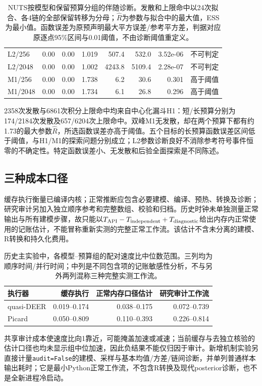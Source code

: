 \begin{table}[htbp]
\begin{tabular}{lrrrrrrl}
L2/256 & 0.00 & 0.00 & 1.019 & 507.4 & 532.0 & 3.52e-06 & 不可判定\\

L2/2048 & 0.00 & 0.00 & 1.002 & 4243.8 & 5109.4 & 2.28e-07 & 不可判定\\

M1/256 & 0.00 & 0.00 & 1.738 & 6.2 & 30.6 & 0.301 & 高于阈值\\

M1/2048 & 0.00 & 0.00 & 1.734 & 6.1 & 26.8 & 0.296 & 高于阈值\\

\bottomrule\end{tabular}
\caption{NUTS按模型和保留预算分组的伴随诊断。发散和上限命中以24次拟合、各4链的全部保留转移为分母；$\hat R$为参数与拟合中的最大值，ESS为最小值。函数误差为原预声明最大平方误差/参考平方差，判据对应原逐点95\%区间与0.01阈值，不由诊断阈值重定义。}
\end{table}
2358次发散与6861次积分上限命中均来自中心化漏斗H1：短/长预算分别为174/2184次发散及657/6204次上限命中。双峰M1无发散，却在两个预算下都有约1.73的最大参数$\hat R$，所选函数误差亦高于阈值。五个目标的长预算函数误差区间低于阈值，与H1/M1的探索问题分别成立；L2参数诊断良好不消除参考符号事件恒零的不确定性。特定函数误差小、无发散和后验全面探索是不同陈述。

\subsection{三种成本口径}
缓存执行衡量已编译内核；正常推断应包含必要建模、编译、预热、转换及诊断；研究审计另加入独立顺序参考和完整数组、校验和归档。历史时钟未单独测量正常输出与所有建模步骤，故只能以$T_{\rm API}-T_{\rm independent}+T_{\rm diagnostic}$给出内存内正常使用的记账估计，不能冒称重新实测的完整正常工作流。该估计不含未分离的建模、R转换和持久化费用。

\begin{table}[htbp]\centering\small\setlength{\tabcolsep}{4pt}
\begin{tabular}{lrrr}\toprule
执行器 & 缓存执行 & 正常内存口径估计 & 研究审计工作流\\\midrule

quasi-DEER & 0.019--0.174 & 0.038--0.175 & 0.072--0.739\\

Picard & 0.050--0.809 & 0.110--0.393 & 0.226--0.814\\

\bottomrule\end{tabular}
\caption{历史主实验中，各模型--预算组的配对速度比中位数范围。三列均为顺序时间/并行时间；中列是不同包含项的记账敏感性分析，不与另外两列混称三种完整实测工作流。}
\end{table}
共享审计成本使速度比向1靠近，可能掩盖加速或减速；当前缓存与去独立核验的估计口径也均未显示组中位加速，因此负结果不能仅归因于审计。新增机制实验另直接计量\texttt{audit=False}的建模、采样与基本均值/方差/链间诊断，并单列普通样本输出耗时；它是最小Python正常工作流，不包含R转换及现代posterior诊断，也不是全新进程冷启动。

